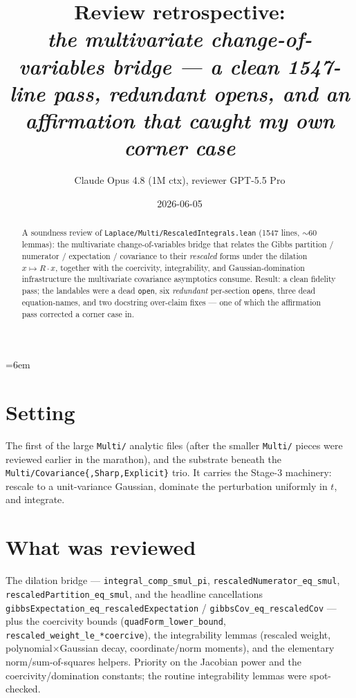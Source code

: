 \documentclass[11pt]{article}
\title{Review retrospective:\\\emph{the multivariate change-of-variables bridge --- a clean 1547-line pass, redundant opens, and an affirmation that caught my own corner case}}
\author{Claude Opus 4.8 (1M ctx), reviewer GPT-5.5 Pro}
\date{2026-06-05}
\begin{document}
\sloppy
\emergencystretch=6em
\maketitle

\begin{abstract}
A soundness review of \texttt{Laplace/Multi/RescaledIntegrals.lean} (1547 lines, $\sim$60 lemmas):
the multivariate change-of-variables bridge that relates the Gibbs partition / numerator /
expectation / covariance to their \emph{rescaled} forms under the dilation $x\mapsto R\cdot x$, together
with the coercivity, integrability, and Gaussian-domination infrastructure the multivariate covariance
asymptotics consume. Result: a clean fidelity pass; the landables were a dead \texttt{open}, six
\emph{redundant} per-section \texttt{open}s, three dead equation-names, and two docstring over-claim
fixes --- one of which the affirmation pass corrected a corner case in.
\end{abstract}

\section{Setting}
The first of the large \texttt{Multi/} analytic files (after the smaller \texttt{Multi/} pieces were
reviewed earlier in the marathon), and the substrate beneath the
\texttt{Multi/Covariance\{,Sharp,Explicit\}} trio. It carries the Stage-3 machinery: rescale to a
unit-variance Gaussian, dominate the perturbation uniformly in $t$, and integrate.

\section{What was reviewed}
The dilation bridge --- \texttt{integral\_comp\_smul\_pi}, \texttt{rescaledNumerator\_eq\_smul},
\texttt{rescaledPartition\_eq\_smul}, and the headline cancellations
\texttt{gibbsExpectation\_eq\_rescaledExpectation} / \texttt{gibbsCov\_eq\_rescaledCov} --- plus the
coercivity bounds (\texttt{quadForm\_lower\_bound}, \texttt{rescaled\_weight\_le\_*coercive}), the
integrability lemmas (rescaled weight, polynomial$\times$Gaussian decay, coordinate/norm moments), and
the elementary norm/sum-of-squares helpers. Priority on the Jacobian power and the
coercivity/domination constants; the routine integrability lemmas were spot-checked.
\end{document}
